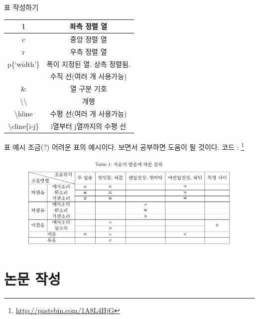 \documentclass[12pt]{beamer}
\begin{document}
\begin{frame}{표 작성하기}
	\begin{table}
		\centering
		\begin{tabular}{|c|c|}
			\hline
			l & 좌측 정렬 열 \\
			\hline
			c & 중앙 정렬 열 \\
			\hline
			r & 우측 정렬 열 \\
			\hline
			p\{`width'\} & 폭이 지정된 열. 상측 정렬됨. \\
			\hline
			\textbar & 수직 선(여러 개 사용가능) \\
			\hline
			\& & 열 구분 기호 \\
			\hline
			\textbackslash\textbackslash & 개행 \\
			\hline
			\textbackslash hline & 수평 선(여러 개 사용가능) \\
			\hline
			\textbackslash cline\{i-j\} & i열부터 j열까지의 수평 선 \\
			\hline
		\end{tabular}
	\end{table}
\end{frame}
\begin{frame}{표 예시}
	조금(?) 어려운 표의 예시이다. 보면서 공부하면 도움이 될 것이다.
	코드 : \footnote{\url{http://pastebin.com/1A8L4HjG}}
	\begin{figure}
		\centering
		\includegraphics[width=\textwidth]{table_adv.pdf}
	\end{figure}
\end{frame}



\section{논문 작성}
\end{document}
